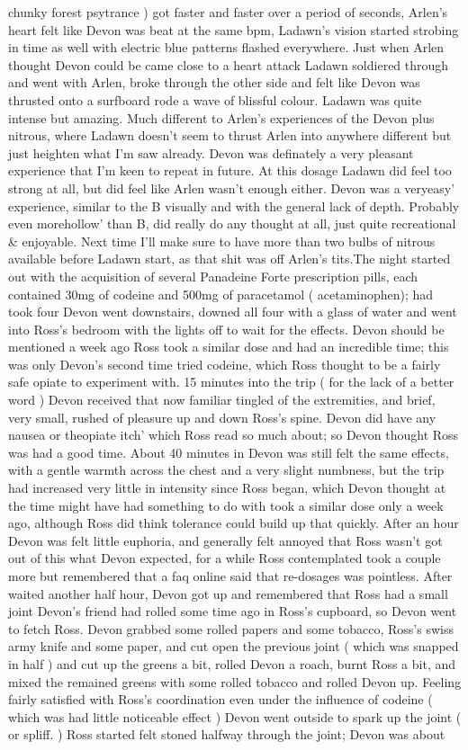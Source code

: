 \documentclass[12pt]{book}
\begin{document}
chunky forest psytrance ) got faster and faster over a period of seconds, Arlen's heart felt like Devon was beat at the same bpm, Ladawn's vision started strobing in time as well with electric blue patterns flashed everywhere. Just when Arlen thought Devon could be came close to a heart attack Ladawn soldiered through and went with Arlen, broke through the other side and felt like Devon was thrusted onto a surfboard rode a wave of blissful colour. Ladawn was quite intense but amazing. Much different to Arlen's experiences of the Devon plus nitrous, where Ladawn doesn't seem to thrust Arlen into anywhere different but just heighten what I'm saw already. Devon was definately a very pleasant experience that I'm keen to repeat in future. At this dosage Ladawn did feel too strong at all, but did feel like Arlen wasn't enough either. Devon was a veryeasy' experience, similar to the B visually and with the general lack of depth. Probably even morehollow' than B, did really do any thought at all, just quite recreational \& enjoyable. Next time I'll make sure to have more than two bulbs of nitrous available before Ladawn start, as that shit was off Arlen's tits.The night started out with the acquisition of several Panadeine Forte prescription pills, each contained 30mg of codeine and 500mg of paracetamol ( acetaminophen); had took four Devon went downstairs, downed all four with a glass of water and went into Ross's bedroom with the lights off to wait for the effects. Devon should be mentioned a week ago Ross took a similar dose and had an incredible time; this was only Devon's second time tried codeine, which Ross thought to be a fairly safe opiate to experiment with. 15 minutes into the trip ( for the lack of a better word ) Devon received that now familiar tingled of the extremities, and brief, very small, rushed of pleasure up and down Ross's spine. Devon did have any nausea or theopiate itch' which Ross read so much about; so Devon thought Ross was had a good time. About 40 minutes in Devon was still felt the same effects, with a gentle warmth across the chest and a very slight numbness, but the trip had increased very little in intensity since Ross began, which Devon thought at the time might have had something to do with took a similar dose only a week ago, although Ross did think tolerance could build up that quickly. After an hour Devon was felt little euphoria, and generally felt annoyed that Ross wasn't got out of this what Devon expected, for a while Ross contemplated took a couple more but remembered that a faq online said that re-dosages was pointless. After waited another half hour, Devon got up and remembered that Ross had a small joint Devon's friend had rolled some time ago in Ross's cupboard, so Devon went to fetch Ross. Devon grabbed some rolled papers and some tobacco, Ross's swiss army knife and some paper, and cut open the previous joint ( which was snapped in half ) and cut up the greens a bit, rolled Devon a roach, burnt Ross a bit, and mixed the remained greens with some rolled tobacco and rolled Devon up. Feeling fairly satisfied with Ross's coordination even under the influence of codeine ( which was had little noticeable effect ) Devon went outside to spark up the joint ( or spliff. ) Ross started felt stoned halfway through the joint; Devon was about 
\end{document}
